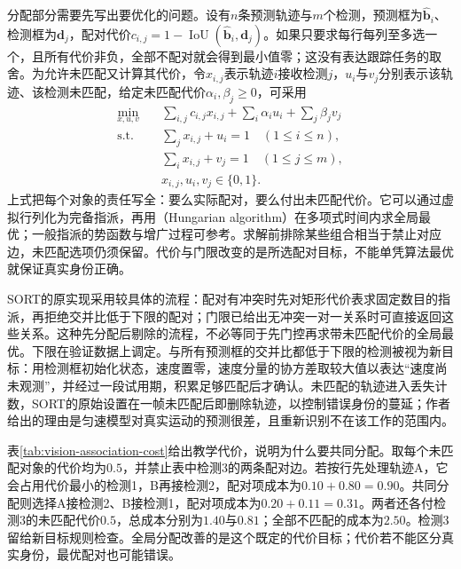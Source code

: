分配部分需要先写出要优化的问题。设有$n$条预测轨迹与$m$个检测，预测框为$\widehat{\bm{b}}_i$、检测框为$\bm{d}_j$，配对代价$c_{i,j}=1-\operatorname{IoU}(\widehat{\bm{b}}_i,\bm{d}_j)$。如果只要求每行每列至多选一个，且所有代价非负，全部不配对就会得到最小值零；这没有表达跟踪任务的取舍。为允许未匹配又计算其代价，令$x_{i,j}$表示轨迹$i$接收检测$j$，$u_i$与$v_j$分别表示该轨迹、该检测未匹配，给定未匹配代价$\alpha_i,\beta_j\geq0$，可采用
\begin{equation}
  \begin{aligned}
  \min_{x,u,v}\quad&\sum_{i,j}c_{i,j}x_{i,j}
     +\sum_i\alpha_i u_i+\sum_j\beta_j v_j\\
  \text{s.t.}\quad&\sum_jx_{i,j}+u_i=1\quad(1\leq i\leq n),\\
  &\sum_ix_{i,j}+v_j=1\quad(1\leq j\leq m),\\
  &x_{i,j},u_i,v_j\in\{0,1\}.
  \end{aligned}
  \label{eq:vision-video-assignment}
\end{equation}
上式把每个对象的责任写全：要么实际配对，要么付出未匹配代价。它可以通过虚拟行列化为完备指派，再用（Hungarian algorithm）在多项式时间内求全局最优；一般指派的势函数与增广过程可参考。求解前排除某些组合相当于禁止对应边，未匹配选项仍须保留。代价与门限改变的是所选配对目标，不能单凭算法最优就保证真实身份正确。

SORT的原实现采用较具体的流程：配对有冲突时先对矩形代价表求固定数目的指派，再拒绝交并比低于下限的配对；门限已给出无冲突一对一关系时可直接返回这些关系。这种先分配后剔除的流程，不必等同于先门控再求带未匹配代价的全局最优。下限在验证数据上调定。与所有预测框的交并比都低于下限的检测被视为新目标：用检测框初始化状态，速度置零，速度分量的协方差取较大值以表达“速度尚未观测”，并经过一段试用期，积累足够匹配后才确认。未匹配的轨迹进入丢失计数，SORT的原始设置在一帧未匹配后即删除轨迹，以控制错误身份的蔓延；作者给出的理由是匀速模型对真实运动的预测很差，且重新识别不在该工作的范围内。

表\ref{tab:vision-association-cost}给出教学代价，说明为什么要共同分配。取每个未匹配对象的代价均为$0.5$，并禁止表中检测3的两条配对边。若按行先处理轨迹A，它会占用代价最小的检测1，B再接检测2，配对项成本为$0.10+0.80=0.90$。共同分配则选择A接检测2、B接检测1，配对项成本为$0.20+0.11=0.31$。两者还各付检测3的未匹配代价$0.5$，总成本分别为$1.40$与$0.81$；全部不匹配的成本为$2.50$。检测3留给新目标规则检查。全局分配改善的是这个既定的代价目标；代价若不能区分真实身份，最优配对也可能错误。

